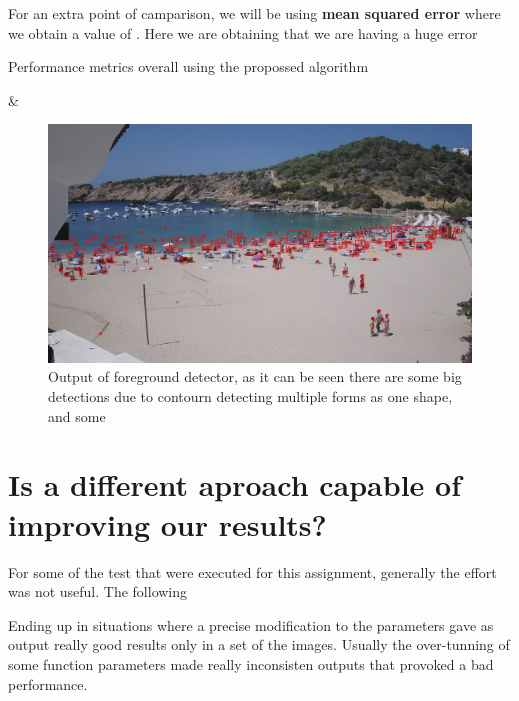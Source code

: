 \documentclass[11pt]{article}
\begin{document}
For an extra point of camparison, we will be using \textbf{mean squared error} where we obtain a value of . Here we are obtaining that we are having a huge error 

\begin{table} [hp]
    \centering
    \caption[Performance metrics overall]{Performance metrics overall using the propossed algorithm}\label{table:metrics_2}

  {\csvcoli & \csvcolii}%
\end{table}


\begin{figure}
    \centering
    \includegraphics[width=\textwidth]{img/det_name.jpg}
    \caption{Output of foreground detector, as it can be seen there are some big detections due to contourn detecting multiple forms as one shape, and some }
    \label{fig:detections}
\end{figure}


\section{Is a different aproach capable of improving our results?}

For some of the test that were executed for this assignment, generally the effort was not useful. The following  


Ending up in situations where a precise modification to the parameters gave as output really good results only in a set of the images. Usually the over-tunning of some function parameters made really inconsisten outputs that provoked a bad performance.  
\end{document}
